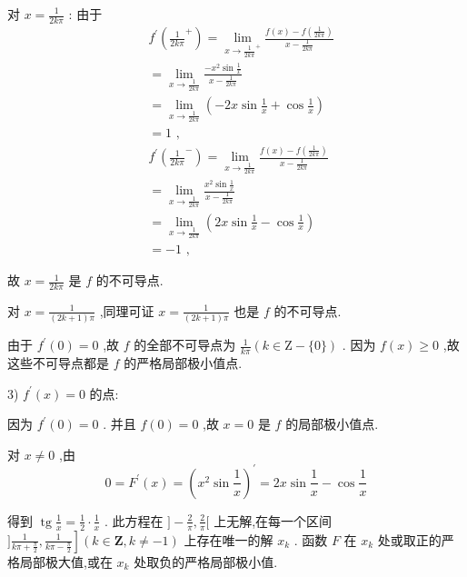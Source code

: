 对 $x = \frac{1}{2k\pi }$ : 由于
\begin{align*}
	&{f}^{\prime }\left( {\frac{1}{2k\pi }}^{ + }\right)  = \mathop{\lim }\limits_{{x \rightarrow  {\frac{1}{2k\pi }}^{ + }}}\frac{f\left( x\right)  - f\left( \frac{1}{2k\pi }\right) }{x - \frac{1}{2k\pi }}\\
	&= \mathop{\lim }\limits_{{x \rightarrow  \frac{1}{2k\pi }}}\frac{-{x}^{2}\sin \frac{1}{x}}{x - \frac{1}{2k\pi }}\\
	&= \mathop{\lim }\limits_{{x \rightarrow  \frac{1}{2k\pi }}}\left( {-{2x}\sin \frac{1}{x} + \cos \frac{1}{x}}\right)\\
	&= 1\text{ , }\\
	&{f}^{\prime }\left( {\frac{1}{2k\pi }}^{ - }\right)  = \mathop{\lim }\limits_{{x \rightarrow  \frac{1}{2k\pi }}}\frac{f\left( x\right)  - f\left( \frac{1}{2k\pi }\right) }{x - \frac{1}{2k\pi }}\\
	&= \mathop{\lim }\limits_{{x \rightarrow  \frac{1}{2k\pi }}}\frac{{x}^{2}\sin \frac{1}{x}}{x - \frac{1}{2k\pi }}\\
	&= \mathop{\lim }\limits_{{x \rightarrow  \frac{1}{2k\pi }}}\left( {{2x}\sin \frac{1}{x} - \cos \frac{1}{x}}\right)\\
	&=  - 1\text{ , }
\end{align*}

故 $x = \frac{1}{2k\pi }$ 是 $f$ 的不可导点.

对 $x = \frac{1}{\left( {{2k} + 1}\right) \pi }$ ,同理可证 $x = \frac{1}{\left( {{2k} + 1}\right) \pi }$ 也是 $f$ 的不可导点.

由于 ${f}^{\prime }\left( 0\right)  = 0$ ,故 $f$ 的全部不可导点为 $\frac{1}{k\pi }\left( {k \in  \mathrm{Z}-\{ 0\} }\right)$ . 因为 $f\left( x\right)  \geq  0$ ,故这些不可导点都是 $f$ 的严格局部极小值点.

3) ${f}^{\prime }\left( x\right)  = 0$ 的点:

因为 ${f}^{\prime }\left( 0\right)  = 0$ . 并且 $f\left( 0\right)  = 0$ ,故 $x = 0$ 是 $f$ 的局部极小值点.

对 $x \neq  0$ ,由
$$0 = {F}^{\prime }\left( x\right)  = {\left( {x}^{2}\sin \frac{1}{x}\right) }^{\prime } = {2x}\sin \frac{1}{x} - \cos \frac{1}{x}$$

得到 $\operatorname{tg}\frac{1}{x} = \frac{1}{2} \cdot  \frac{1}{x}$ . 此方程在 $\rbrack  - \frac{2}{\pi },\frac{2}{\pi }\lbrack$ 上无解,在每一个区间 $\left. {\rbrack \frac{1}{{k\pi } + \frac{\pi }{2}},\frac{1}{{k\pi } - \frac{\pi }{2}}}\right\rbrack  \left( {k \in  \mathbf{Z},k \neq   - 1}\right)$ 上存在唯一的解 ${x}_{k}$ . 函数 $F$ 在 ${x}_{k}$ 处或取正的严格局部极大值,或在 ${x}_{k}$ 处取负的严格局部极小值.


